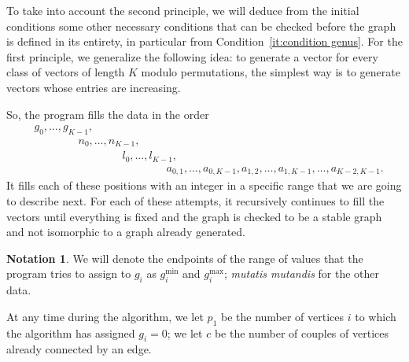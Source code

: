 \documentclass{amsart}
\theoremstyle{plain}
\theoremstyle{definition}
\newtheorem{notation}[theorem]{Notation}
\DeclareMathOperator{\MAX}{max}
\begin{document}
To take into account the second principle, we will deduce from the
initial conditions some other necessary conditions that can be checked
before the graph is defined in its entirety, in particular from
Condition~\ref{it:condition genus}. For the first principle, we
generalize the following idea: to generate a vector for every class of
vectors of length $K$ modulo permutations, the simplest way is to
generate vectors whose entries are increasing.

So, the program fills the data in the order
\begin{align*}
  & g_0, \dots, g_{K-1}, \\
  & \qquad \qquad n_0, \dots, n_{K-1}, \\
  & \qquad \qquad \qquad \qquad l_0, \dots, l_{K-1}, \\
  & \qquad \qquad \qquad \qquad \qquad \qquad a_{0,1}, \dots, a_{0,
    K-1}, a_{1, 2}, \dots, a_{1, K-1}, \dots, a_{K-2, K-1}\text{.}
\end{align*}
It fills each of these positions with an integer in a specific range
that we are going to describe next. For each of these attempts, it
recursively continues to fill the vectors until everything is fixed
and the graph is checked to be a stable graph and not isomorphic to a
graph already generated.

\begin{notation}
  We will denote the endpoints of the range of values that the program
  tries to assign to $g_i$ as $g_i^{\min}$ and $g_i^{\MAX}$;
  \emph{mutatis mutandis\/} for the other data.

  At any time during the algorithm, we let $p_1$ be the number of
  vertices $i$ to which the algorithm has assigned $g_i = 0$; we let
  $c$ be the number of couples of vertices already connected by an
  edge.
\end{notation}
\end{document}
